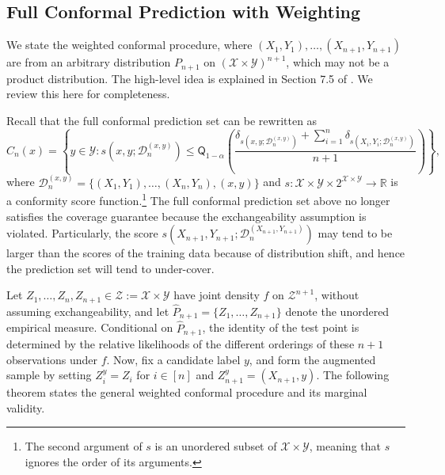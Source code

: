 \documentclass[11pt,letterpaper]{article}
\theoremstyle{definition}
\newcommand{\cD}{\mathcal{D}}
\newcommand{\cX}{\mathcal{X}}
\newcommand{\cY}{\mathcal{Y}}
\newcommand{\R}{\mathbb{R}}
\begin{document}
\subsection{Full Conformal Prediction with Weighting}
We state the weighted conformal procedure, where $(X_1, Y_1), \ldots, (X_{n + 1}, Y_{n + 1})$ are from an arbitrary distribution $P_{n + 1}$ on $(\cX \times \cY)^{n + 1}$, which may not be a product distribution. The high-level idea is explained in Section 7.5 of \cite{angelopoulos2024theoretical}. We review this here for completeness.

Recall that the full conformal prediction set can be rewritten as
\begin{equation*}
    C_n(x) = \left\{y \in \cY : s(x, y; \cD_n^{(x, y)}) \le \mathsf{Q}_{1 - \alpha}\left(\frac{\delta_{s(x, y; \cD_n^{(x, y)})} + \sum_{i = 1}^{n} \delta_{s(X_i, Y_i; \cD_n^{(x, y)})}}{n + 1}\right)\right\},
\end{equation*}
where $\cD_n^{(x, y)} = \{(X_1, Y_1), \ldots, (X_n, Y_n), (x, y)\}$ and $s \colon \cX \times \cY \times 2^{\cX \times \cY} \to \R$ is a conformity score function.\footnote{The second argument of $s$ is an unordered subset of $\cX \times \cY$, meaning that $s$ ignores the order of its arguments.} The full conformal prediction set above no longer satisfies the coverage guarantee because the exchangeability assumption is violated. Particularly, the score $s(X_{n + 1}, Y_{n + 1}; \cD_n^{(X_{n + 1}, Y_{n + 1})})$ may tend to be larger than the scores of the training data because of distribution shift, and hence the prediction set will tend to under-cover. 

Let \(Z_1,\ldots,Z_n,Z_{n+1}\in\mathcal Z := \cX \times \cY\) have joint density \(f\) on \(\mathcal Z^{n+1}\), without assuming exchangeability, and let \(\hat P_{n+1}=\{Z_1,\ldots,Z_{n+1}\}\) denote the unordered empirical measure. Conditional on \(\hat P_{n+1}\), the identity of the test point is determined by the relative likelihoods of the different orderings of these \(n+1\) observations under \(f\). Now, fix a candidate label \(y\), and form the augmented sample by setting \(Z_i^y=Z_i\) for \(i\in[n]\) and \(Z_{n+1}^y=(X_{n+1},y)\). The following theorem states the general weighted conformal procedure and its marginal validity.
\end{document}
